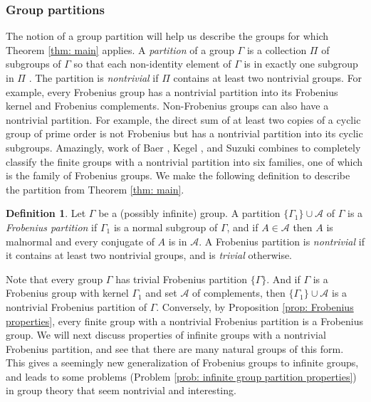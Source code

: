 \documentclass[12pt]{article}
\theoremstyle{definition}
\newtheorem{definition}[theorem]{Definition}
\newcommand{\cA}{\mathcal{A}}
\begin{document}
\subsubsection{Group partitions}
The notion of a group partition will help us describe the groups for which Theorem \ref{thm: main} applies.
A \emph{partition} of a group $\Gamma$ is a collection $\Pi$ of subgroups of $\Gamma$ so that each non-identity element of $\Gamma$ is in exactly one subgroup in $\Pi$ \cite{Miller-1906}.
The partition is \emph{nontrivial} if $\Pi$ contains at least two nontrivial groups.
For example, every Frobenius group has a nontrivial partition into its Frobenius kernel and Frobenius complements.
Non-Frobenius groups can also have a nontrivial partition.
For example, the direct sum of at least two copies of a cyclic group of prime order is not Frobenius but has a nontrivial partition into its cyclic subgroups.
Amazingly, work of Baer \cite{Baer-1961}, Kegel \cite{Kegel-1961}, and Suzuki \cite{Suzuki-1961} combines to completely classify the finite groups with a nontrivial partition into six families, one of which is the family of Frobenius groups.
We make the following definition to describe the partition from Theorem \ref{thm: main}.

\begin{definition}  \label{def: Frobenius partition}
Let $\Gamma$ be a (possibly infinite) group.
A partition $\{\Gamma_1\} \cup \cA$ of $\Gamma$ is a \emph{Frobenius partition} if $\Gamma_1$ is a normal subgroup of $\Gamma$, and if $A \in \cA$ then $A$ is malnormal and every conjugate of $A$ is in $\cA$.
A Frobenius partition is \emph{nontrivial} if it contains at least two nontrivial groups, and is \emph{trivial} otherwise.
\end{definition}


Note that every group $\Gamma$ has trivial Frobenius partition $\{\Gamma\}$.
And if $\Gamma$ is a Frobenius group with kernel $\Gamma_1$ and set $\cA$ of complements, then $\{\Gamma_1\} \cup \cA$ is a nontrivial Frobenius partition of $\Gamma$.
Conversely, by Proposition \ref{prop: Frobenius properties}, every finite group with a nontrivial Frobenius partition is a Frobenius group.
We will next discuss properties of infinite groups with a nontrivial Frobenius partition, and see that there are many natural groups of this form.
This gives a seemingly new generalization of Frobenius groups to infinite groups, and leads to some problems (Problem \ref{prob: infinite group partition properties}) in group theory that seem nontrivial and interesting.
\end{document}
